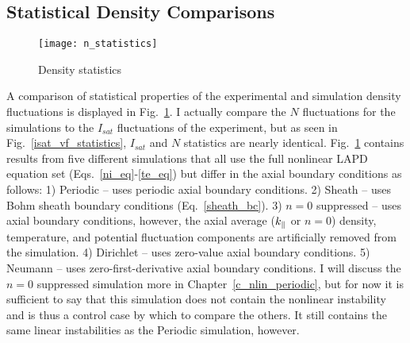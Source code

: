 \subsection{Statistical Density Comparisons}
\label{ss_stat_dens_comps}

\begin{figure}
\centerline{\texttt{[image: n\_statistics]}}
\caption{Density statistics}
\label{n_statistics}
\end{figure}


A comparison of statistical properties of the experimental and simulation density fluctuations is displayed in Fig.~\ref{n_statistics}. I actually compare the $N$ fluctuations for the simulations
to the $I_{sat}$ fluctuations of the experiment, but as seen in Fig.~\ref{isat_vf_statistics}, $I_{sat}$ and $N$ statistics are nearly identical.
Fig.~\ref{n_statistics} contains results from five different simulations
that all use the full nonlinear LAPD equation set (Eqs.~\ref{ni_eq}-\ref{te_eq}) but differ in the axial boundary conditions as follows:
1) Periodic -- uses periodic axial boundary conditions. 2) Sheath -- uses Bohm sheath boundary conditions (Eq.~\ref{sheath_bc}). 3) $n=0$ suppressed -- uses axial boundary conditions,
however, the axial average ($k_\parallel$ or $n = 0$) density, temperature, and potential fluctuation components are artificially removed from the simulation. 4) Dirichlet -- uses zero-value axial
boundary conditions. 5) Neumann -- uses zero-first-derivative axial boundary conditions. I will discuss the $n=0$ suppressed simulation more in Chapter~\ref{c_nlin_periodic}, but for
now it is sufficient to say that this simulation does not contain the nonlinear instability and is thus a control case by which to compare the others. It still contains the same
linear instabilities as the Periodic simulation, however.

